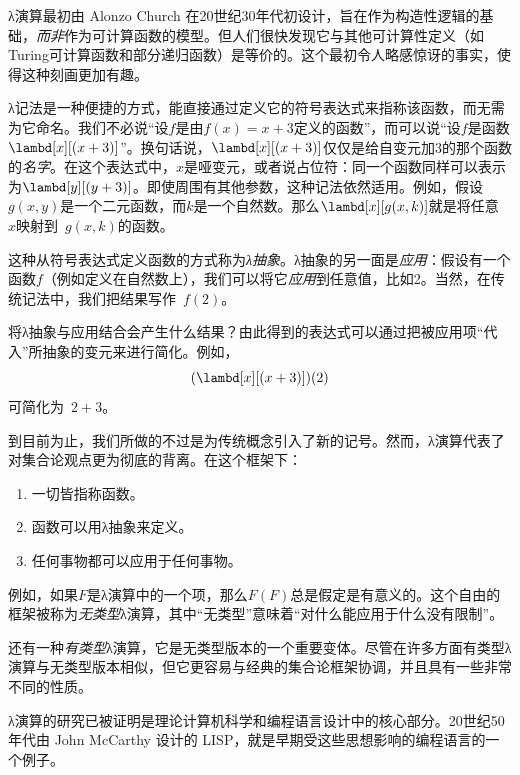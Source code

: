 \documentclass[../../../include/open-logic-section]{subfiles}
\begin{document}

λ演算最初由 Alonzo Church 在20世纪30年代初设计，旨在作为构造性逻辑的基础，\emph{而非}作为可计算函数的模型。但人们很快发现它与其他可计算性定义（如Turing可计算函数和部分递归函数）是等价的。这个最初令人略感惊讶的事实，使得这种刻画更加有趣。

λ记法是一种便捷的方式，能直接通过定义它的符号表达式来指称该函数，而无需为它命名。我们不必说“设$f$是由$f(x) = x + 3$定义的函数”，而可以说“设$f$是函数$\lambd[x][(x + 3)]$”。换句话说，$\lambd[x][(x+3)]$仅仅是给自变元加3的那个函数的\emph{名字}。在这个表达式中，$x$是哑变元，或者说占位符：同一个函数同样可以表示为$\lambd[y][(y + 3)]$。即使周围有其他参数，这种记法依然适用。例如，假设$g(x, y)$是一个二元函数，而$k$是一个自然数。那么$\lambd[x][g(x,k)]$就是将任意~$x$映射到~$g(x, k)$的函数。

这种从符号表达式定义函数的方式称为\emph{λ抽象}。λ抽象的另一面是\emph{应用}：假设有一个函数$f$（例如定义在自然数上），我们可以将它\emph{应用}到任意值，比如2。当然，在传统记法中，我们把结果写作~$f(2)$。

将λ抽象与应用结合会产生什么结果？由此得到的表达式可以通过把被应用项“代入”所抽象的变元来进行简化。例如，
\[
(\lambd[x][(x + 3)])(2)
\]
可简化为~$2 + 3$。

到目前为止，我们所做的不过是为传统概念引入了新的记号。然而，λ演算代表了对集合论观点更为彻底的背离。在这个框架下：
\begin{enumerate}
\item 一切皆指称函数。
\item 函数可以用λ抽象来定义。
\item 任何事物都可以应用于任何事物。
\end{enumerate}

例如，如果$F$是λ演算中的一个项，那么$F(F)$总是假定是有意义的。这个自由的框架被称为\emph{无类型}λ演算，其中“无类型”意味着“对什么能应用于什么没有限制”。

\begin{digress}
还有一种\emph{有类型}λ演算，它是无类型版本的一个重要变体。尽管在许多方面有类型λ演算与无类型版本相似，但它更容易与经典的集合论框架协调，并且具有一些非常不同的性质。

λ演算的研究已被证明是理论计算机科学和编程语言设计中的核心部分。20世纪50年代由 John McCarthy 设计的 LISP，就是早期受这些思想影响的编程语言的一个例子。
\end{digress}
\end{document}
